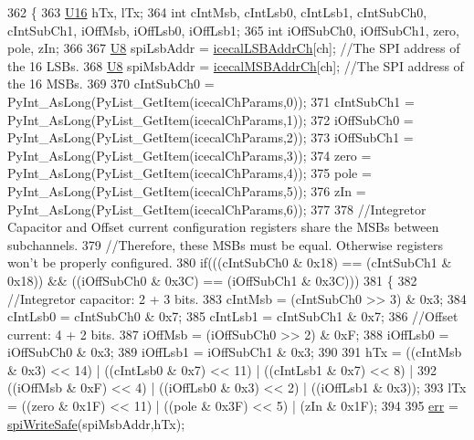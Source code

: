 \begin{DoxyCode}
362 \{                            
363     \hyperlink{ICECALv3_8h_adf928e51a60dba0df29d615401cc55a8}{U16} hTx, lTx;
364     \textcolor{keywordtype}{int} cIntMsb, cIntLsb0, cIntLsb1, cIntSubCh0, cIntSubCh1, iOffMsb, iOffLsb0, iOffLsb1;
365     \textcolor{keywordtype}{int} iOffSubCh0, iOffSubCh1, zero, pole, zIn;
366 
367     \hyperlink{ICECALv3_8h_a3cb25ca6f51f003950f9625ff05536fc}{U8} spiLsbAddr = \hyperlink{ICECALv3_8h_abd124f50fa794b9b0aded801fabf5322}{icecalLSBAddrCh}[ch];           \textcolor{comment}{//The SPI address of the 16 LSBs.}
368     \hyperlink{ICECALv3_8h_a3cb25ca6f51f003950f9625ff05536fc}{U8} spiMsbAddr = \hyperlink{ICECALv3_8h_afba64a649cc9314882fd49b62b99d6e7}{icecalMSBAddrCh}[ch];           \textcolor{comment}{//The SPI address of the 16 MSBs.}
369 
370     cIntSubCh0 = PyInt\_AsLong(PyList\_GetItem(icecalChParams,0));
371     cIntSubCh1 = PyInt\_AsLong(PyList\_GetItem(icecalChParams,1));
372     iOffSubCh0 = PyInt\_AsLong(PyList\_GetItem(icecalChParams,2));
373     iOffSubCh1 = PyInt\_AsLong(PyList\_GetItem(icecalChParams,3));
374     zero             = PyInt\_AsLong(PyList\_GetItem(icecalChParams,4));
375     pole             = PyInt\_AsLong(PyList\_GetItem(icecalChParams,5));
376     zIn              = PyInt\_AsLong(PyList\_GetItem(icecalChParams,6));
377 
378     \textcolor{comment}{//Integretor Capacitor and Offset current configuration registers share the MSBs between subchannels.}
379     \textcolor{comment}{//Therefore, these MSBs must be equal. Otherwise registers won't be properly configured. }
380     \textcolor{keywordflow}{if}(((cIntSubCh0 & 0x18) == (cIntSubCh1 & 0x18)) && ((iOffSubCh0 & 0x3C) == (iOffSubCh1 & 0x3C)))
381     \{
382         \textcolor{comment}{//Integretor capacitor: 2 + 3 bits.}
383         cIntMsb  = (cIntSubCh0 >> 3) & 0x3;
384         cIntLsb0 =  cIntSubCh0 & 0x7;
385         cIntLsb1 =  cIntSubCh1 & 0x7;
386         \textcolor{comment}{//Offset current: 4 + 2 bits.}
387         iOffMsb  = (iOffSubCh0 >> 2) & 0xF;
388         iOffLsb0 =  iOffSubCh0 & 0x3;
389         iOffLsb1 =  iOffSubCh1 & 0x3;
390 
391         hTx =  ((cIntMsb & 0x3) << 14) | ((cIntLsb0 & 0x7) << 11) | ((cIntLsb1 & 0x7) << 8) | 
392                      ((iOffMsb & 0xF) << 4)  | ((iOffLsb0 & 0x3) << 2)  | ((iOffLsb1 & 0x3));
393         lTx =    ((zero & 0x1F) << 11)   | ((pole & 0x3F) << 5)     | (zIn & 0x1F);
394 
395                             \hyperlink{classICECALv3_ad8989925ee5b3ff322d863ce6aaff0bd}{err} = \hyperlink{classICECALv3_aa0b8358ea0be8e47a8aded5e1551787f}{spiWriteSafe}(spiMsbAddr,hTx);  

\end{DoxyCode}
